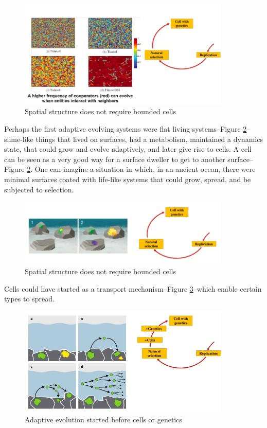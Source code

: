 \documentclass[]{article}
\begin{document}
\begin{figure}[H]
	\caption{Spatial structure does not require bounded cells}\label{fig:WangWang}
	\includegraphics[width=0.9\textwidth]{WangWang}
\end{figure}

Perhaps the first adaptive evolving systems were flat living systems--Figure \ref{fig:Baum2018}\cite{baum2018origin}--slime-like things that lived on surfaces, had a metabolism, maintained a dynamics state, that could grow and evolve adaptively, and later give rise to cells. A cell can be seen as a very good way for a surface dweller to get to another surface--Figure \ref{fig:Baum2018}. One can imagine a situation in which, in an ancient ocean, there were minimal surfaces coated with life-like systems that could grow, spread, and be subjected to selection.

\begin{figure}[H]
	\caption{Spatial structure does not require bounded cells}\label{fig:Baum2018}
	\includegraphics[width=0.9\textwidth]{Baum2018}
\end{figure}

Cells could have started as a transport mechanism--Figure \ref{fig:Baum2015}\cite{10.1093/biosci/biv063}--which enable certain types to spread.

\begin{figure}[H]
	\caption{Adaptive evolution started before cells or genetics}\label{fig:Baum2015}
	\includegraphics[width=0.9\textwidth]{Baum2015}
\end{figure}
\end{document}
